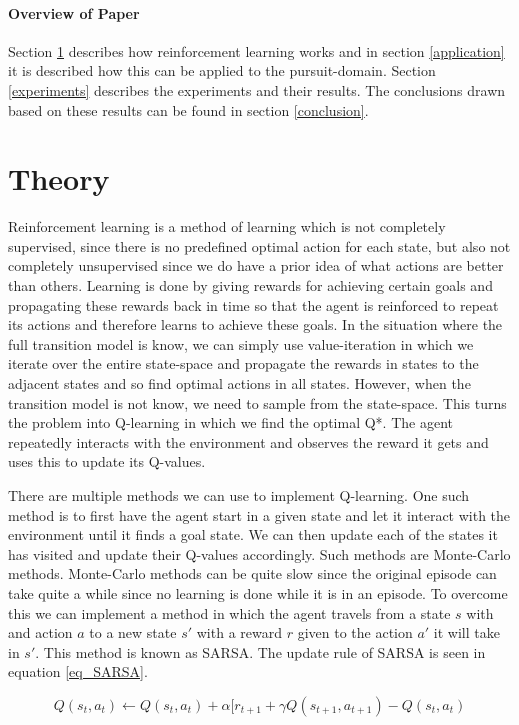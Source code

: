 \documentclass[10pt]{article}
\begin{document}
\paragraph{Overview of Paper}
Section \ref{theory} describes how reinforcement learning works and in section \ref{application} it is described how this can be applied to the pursuit-domain. Section \ref{experiments} describes the experiments and their results. The conclusions drawn based on these results can be found in section \ref{conclusion}.

\section{Theory}\label{theory}
Reinforcement learning is a method of learning which is not completely supervised, since there is no predefined optimal action for each state, but also not completely unsupervised since we do have a prior idea of what actions are better than others. Learning is done by giving rewards for achieving certain goals and propagating these rewards back in time so that the agent is reinforced to repeat its actions and therefore learns to achieve these goals. In the situation where the full transition model is know, we can simply use value-iteration in which we iterate over the entire state-space and propagate the rewards in states to the adjacent states and so find optimal actions in all states. However, when the transition model is not know, we need to sample from the state-space. This turns the problem into Q-learning in which we find the optimal Q*. The agent repeatedly interacts with the environment and observes the reward it gets and uses this to update its Q-values.

There are multiple methods we can use to implement Q-learning. One such method is to first have the agent start in a given state and let it interact with the environment until it finds a goal state. We can then update each of the states it has visited and update their Q-values accordingly. Such methods are Monte-Carlo methods. Monte-Carlo methods can be quite slow since the original episode can take quite a while since no learning is done while it is in an episode. To overcome this we can implement a method in which the agent travels from a state $s$ with and action $a$ to a new state $s'$ with a reward $r$ given to the action $a'$ it will take in $s'$. This method is known as SARSA. The update rule of SARSA is seen in equation \ref{eq_SARSA}.

\begin{equation}\label{eq_SARSA}
	Q(s_t,a_t) \leftarrow Q(s_t,a_t) + \alpha[r_{t+1} + \gamma Q(s_{t+1},a_{t+1})-Q(s_t,a_t)
\end{equation}
\end{document}
